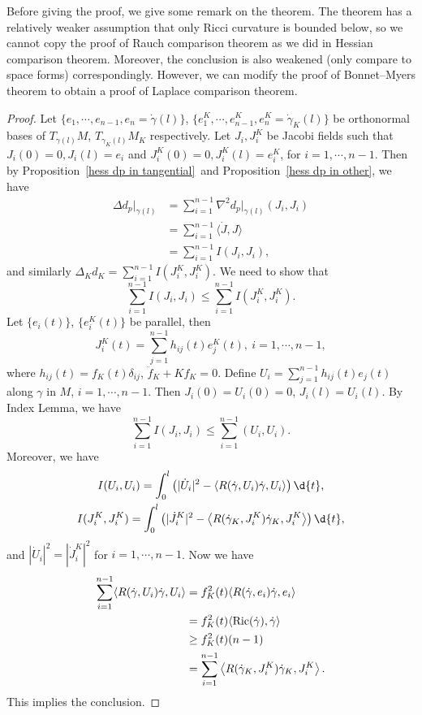 \begin{rem}
    Before giving the proof, we give some remark on the theorem.
    The theorem has a relatively weaker assumption that only Ricci curvature is bounded below, so we cannot copy the proof of Rauch comparison theorem as we did in Hessian comparison theorem.
    Moreover, the conclusion is also weakened (only compare to space forms) correspondingly.
    However, we can modify the proof of Bonnet--Myers theorem to obtain a proof of Laplace comparison theorem.
\end{rem}
\begin{proof}
    Let $\{e_1,\cdots,e_{n-1},e_n=\dot{\gamma}(l)\}$, $\{e_1^K,\cdots,e_{n-1}^K,e_n^K=\dot{\gamma}_K(l)\}$ be orthonormal bases of $T_{\gamma(l)}M$, $T_{\gamma_K(l)}M_K$ respectively.
    Let $J_i,J_i^K$ be Jacobi fields such that $J_i(0)=0,J_i(l)=e_i$ and $J_i^K(0)=0,J_i^K(l)=e_i^K$, for $i=1,\cdots,n-1$.
    Then by Proposition~\ref{hess dp in tangential}~and Proposition~\ref{hess dp in other}, we have
    \begin{align*}
        \Delta d_p|_{\gamma(l)}&=\sum_{i=1}^{n-1}\nabla^2d_p|_{\gamma(l)}(J_i,J_i)\\
        &=\sum_{i=1}^{n-1}\langle\dot{J},J\rangle\\
        &=\sum_{i=1}^{n-1}I(J_i,J_i),
    \end{align*}
    and similarly $\Delta_Kd_K=\sum_{i=1}^{n-1}I(J_i^K,J_i^K)$.
    We need to show that 
    \[\sum_{i=1}^{n-1}I(J_i,J_i)\leq\sum_{i=1}^{n-1}I(J_i^K,J_i^K).\]
    Let $\{e_i(t)\}$, $\{e_i^K(t)\}$ be parallel, then
    \[J^K_i(t)=\sum_{j=1}^{n-1}h_{ij}(t)e_j^K(t),\ i=1,\cdots,n-1,\]
    where $h_{ij}(t)=f_K(t)\delta_{ij}$, $\ddot{f}_K+Kf_K=0$.
    Define $U_i=\sum_{j=1}^{n-1}h_{ij}(t)e_j(t)$ along $\gamma$ in $M$, $i=1,\cdots,n-1$.
    Then $J_i(0)=U_i(0)=0$, $J_i(l)=U_i(l)$.
    By Index Lemma, we have
    \[\sum_{i=1}^{n-1}I(J_i,J_i)\leq\sum_{i=1}^{n-1}(U_i,U_i).\]
    Moreover, we have
    \begin{gather*}
        I(U_i,U_i)=\int_0^l\left(|\dot{U}_i|^2-\langle R(\dot{\gamma},U_i)\dot{\gamma},U_i\rangle\right)\d{t},\\
        I(J_i^K,J_i^K)=\int_0^l\left(|\dot{J}_i^K|^2-\left\langle R(\dot{\gamma}_K,J_i^K)\dot{\gamma}_K,J_i^K\right\rangle\right)\d{t},
    \end{gather*}
    and $|\dot{U}_i|^2=|\dot{J}_i^K|^2$ for $i=1,\cdots,n-1$.
    Now we have
    \begin{align*}
        \sum_{i=1}^{n-1}\langle R(\dot{\gamma},U_i)\dot{\gamma},U_i\rangle&=f_K^2(t)\langle R(\dot{\gamma},e_i)\dot{\gamma},e_i\rangle\\
        &=f^2_K(t)\langle\operatorname{Ric}(\dot{\gamma}),\dot{\gamma}\rangle\\
        &\geq f^2_K(t)(n-1)\\
        &=\sum_{i=1}^{n-1}\left\langle R(\dot{\gamma}_K,J_i^K)\dot{\gamma}_K,J_i^K\right\rangle.
    \end{align*}
    This implies the conclusion.
\end{proof}

